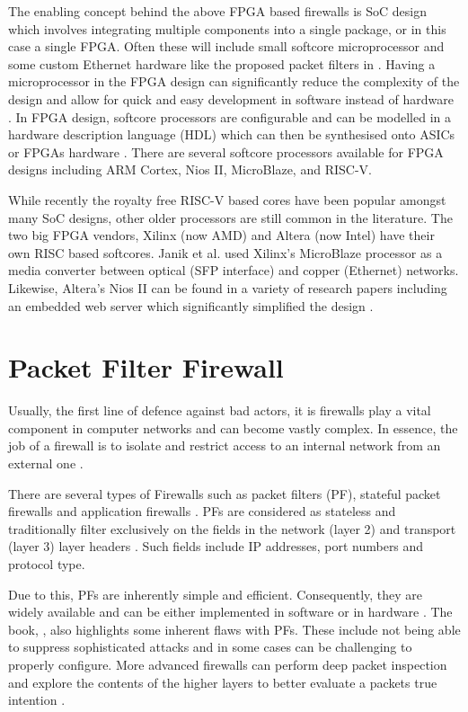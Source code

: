 The enabling concept behind the above FPGA based firewalls is SoC design which involves integrating multiple components into a single package, or in this case a 
single FPGA. Often these will include small softcore microprocessor and some custom Ethernet hardware like the proposed packet filters in \cite{LwIPFPGAFirewall}.
Having a microprocessor in the FPGA design can significantly reduce the complexity of the design and allow for quick and easy development in software instead of 
hardware \cite{SoftcoreBasedEmbeddedSystems}. In FPGA design, softcore processors are configurable and can be modelled in a hardware description language (HDL) 
which can then be synthesised onto ASICs or FPGAs hardware \cite{SoftcoreBasedEmbeddedSystems}. There are several softcore processors available for FPGA 
designs including ARM Cortex, Nios II, MicroBlaze, and RISC-V. 
 
While recently the royalty free RISC-V based cores have been popular amongst many SoC designs, other older processors are still common in the literature. The two 
big FPGA vendors, Xilinx (now AMD) and Altera (now Intel) have their own RISC based softcores. Janik et al. \cite{LwIPMicroblaze} used Xilinx's MicroBlaze processor 
as a media converter between optical (SFP interface) and copper (Ethernet) networks. Likewise, Altera's Nios II can be found in a variety of research papers 
including an embedded web server which significantly simplified the design \cite{NiosIIWebserver}. 



\section{Packet Filter Firewall}

Usually, the first line of defence against bad actors, it is firewalls play a vital component in computer networks and can become vastly complex. 
In essence, the job of a firewall is to isolate and restrict access to an internal network from an external one \cite{BuildingInternetFirewalls}.

There are several types of Firewalls such as packet filters (PF), stateful packet firewalls and application firewalls \cite{FirewallsBook}. 
PFs are considered as stateless and traditionally filter exclusively on the fields in the network (layer 2) and transport 
(layer 3) layer headers \cite{FirewallsBook}. Such fields include IP addresses, port numbers and protocol type.

Due to this, PFs are inherently simple and efficient. Consequently, they are widely available and can be either implemented in software or in 
hardware \cite{BuildingInternetFirewalls}. The book, \cite{BuildingInternetFirewalls}, also highlights some inherent flaws with PFs. These include not being able 
to suppress sophisticated attacks and in some cases can be challenging to properly configure. More advanced firewalls can perform deep packet inspection and 
explore the contents of the higher layers to better evaluate a packets true intention \cite{FirewallsBook}. 

